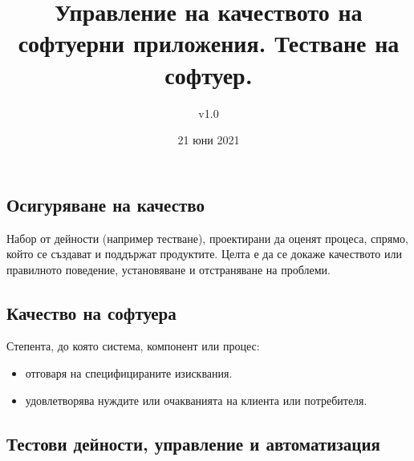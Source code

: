 \documentclass[fleqn,12pt]{article}
\title{Управление на качеството на софтуерни приложения. Тестване на софтуер.}
\author{v1.0}
\date{21 юни 2021}
\begin{document}
\maketitle

\tableofcontents

\begin{flushleft}

\section{Осигуряване на качество}
Набор от дейности (например тестване), проектирани да оценят процеса, спрямо, който се създават и поддържат продуктите. Целта е да се докаже качеството или правилното
поведение, установяване и отстраняване на проблеми.

\subsection{Качество на софтуера}
Степента, до която система, компонент или процес:
\begin{itemize}
    \item отговаря на специфицираните изисквания.
    \item удовлетворява нуждите или очакванията на клиента или потребителя.
\end{itemize}


\subsection{Тестови дейности, управление и автоматизация}

\end{flushleft}
\end{document}
